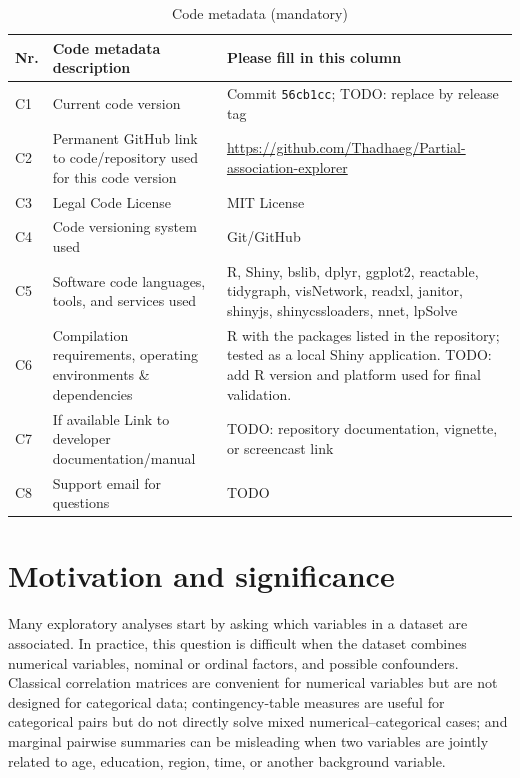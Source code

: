 \documentclass[preprint,12pt,a4paper]{elsarticle}
\begin{document}
\begin{table}[!h]
\begin{tabular}{|l|p{6.5cm}|p{6.5cm}|}
\hline
\textbf{Nr.} & \textbf{Code metadata description} & \textbf{Please fill in this column} \\
\hline
C1 & Current code version & Commit \texttt{56cb1cc}; TODO: replace by release tag \\
\hline
C2 & Permanent GitHub link to code/repository used for this code version & \url{https://github.com/Thadhaeg/Partial-association-explorer} \\
\hline
C3 & Legal Code License & MIT License \\
\hline
C4 & Code versioning system used & Git/GitHub \\
\hline
C5 & Software code languages, tools, and services used & R, Shiny, bslib, dplyr, ggplot2, reactable, tidygraph, visNetwork, readxl, janitor, shinyjs, shinycssloaders, nnet, lpSolve \\
\hline
C6 & Compilation requirements, operating environments \& dependencies & R with the packages listed in the repository; tested as a local Shiny application. TODO: add R version and platform used for final validation. \\
\hline
C7 & If available Link to developer documentation/manual & TODO: repository documentation, vignette, or screencast link \\
\hline
C8 & Support email for questions & TODO \\
\hline
\end{tabular}
\caption{Code metadata (mandatory)}
\label{tab:code-metadata}
\end{table}

\section{Motivation and significance}

Many exploratory analyses start by asking which variables in a dataset are associated. In practice, this question is difficult when the dataset combines numerical variables, nominal or ordinal factors, and possible confounders. Classical correlation matrices are convenient for numerical variables but are not designed for categorical data; contingency-table measures are useful for categorical pairs but do not directly solve mixed numerical--categorical cases; and marginal pairwise summaries can be misleading when two variables are jointly related to age, education, region, time, or another background variable.
\end{document}
